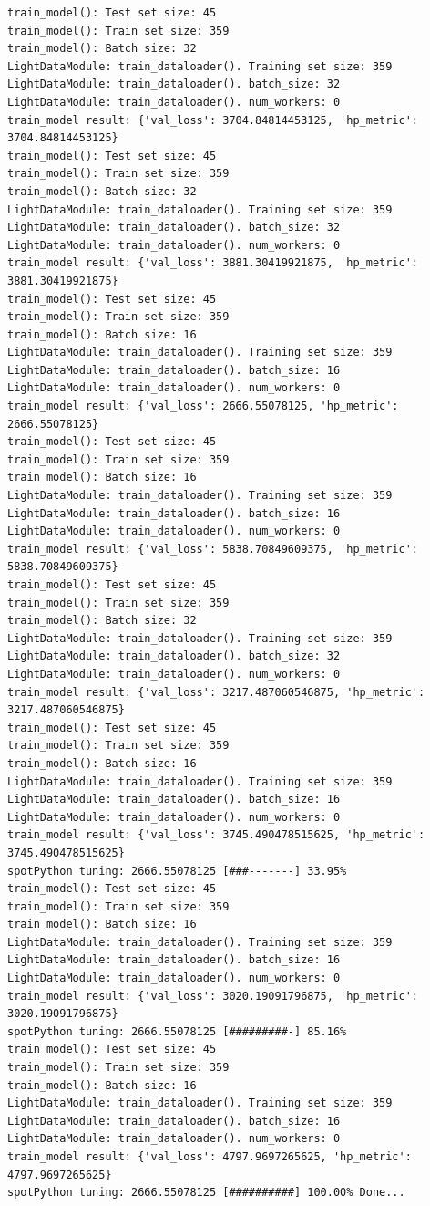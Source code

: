 \documentclass[
  letterpaper,
  DIV=11,
  numbers=noendperiod]{scrreprt}
\begin{document}
\begin{verbatim}
train_model(): Test set size: 45
train_model(): Train set size: 359
train_model(): Batch size: 32
LightDataModule: train_dataloader(). Training set size: 359
LightDataModule: train_dataloader(). batch_size: 32
LightDataModule: train_dataloader(). num_workers: 0
train_model result: {'val_loss': 3704.84814453125, 'hp_metric': 3704.84814453125}
train_model(): Test set size: 45
train_model(): Train set size: 359
train_model(): Batch size: 32
LightDataModule: train_dataloader(). Training set size: 359
LightDataModule: train_dataloader(). batch_size: 32
LightDataModule: train_dataloader(). num_workers: 0
train_model result: {'val_loss': 3881.30419921875, 'hp_metric': 3881.30419921875}
train_model(): Test set size: 45
train_model(): Train set size: 359
train_model(): Batch size: 16
LightDataModule: train_dataloader(). Training set size: 359
LightDataModule: train_dataloader(). batch_size: 16
LightDataModule: train_dataloader(). num_workers: 0
train_model result: {'val_loss': 2666.55078125, 'hp_metric': 2666.55078125}
train_model(): Test set size: 45
train_model(): Train set size: 359
train_model(): Batch size: 16
LightDataModule: train_dataloader(). Training set size: 359
LightDataModule: train_dataloader(). batch_size: 16
LightDataModule: train_dataloader(). num_workers: 0
train_model result: {'val_loss': 5838.70849609375, 'hp_metric': 5838.70849609375}
train_model(): Test set size: 45
train_model(): Train set size: 359
train_model(): Batch size: 32
LightDataModule: train_dataloader(). Training set size: 359
LightDataModule: train_dataloader(). batch_size: 32
LightDataModule: train_dataloader(). num_workers: 0
train_model result: {'val_loss': 3217.487060546875, 'hp_metric': 3217.487060546875}
train_model(): Test set size: 45
train_model(): Train set size: 359
train_model(): Batch size: 16
LightDataModule: train_dataloader(). Training set size: 359
LightDataModule: train_dataloader(). batch_size: 16
LightDataModule: train_dataloader(). num_workers: 0
train_model result: {'val_loss': 3745.490478515625, 'hp_metric': 3745.490478515625}
spotPython tuning: 2666.55078125 [###-------] 33.95% 
train_model(): Test set size: 45
train_model(): Train set size: 359
train_model(): Batch size: 16
LightDataModule: train_dataloader(). Training set size: 359
LightDataModule: train_dataloader(). batch_size: 16
LightDataModule: train_dataloader(). num_workers: 0
train_model result: {'val_loss': 3020.19091796875, 'hp_metric': 3020.19091796875}
spotPython tuning: 2666.55078125 [#########-] 85.16% 
train_model(): Test set size: 45
train_model(): Train set size: 359
train_model(): Batch size: 16
LightDataModule: train_dataloader(). Training set size: 359
LightDataModule: train_dataloader(). batch_size: 16
LightDataModule: train_dataloader(). num_workers: 0
train_model result: {'val_loss': 4797.9697265625, 'hp_metric': 4797.9697265625}
spotPython tuning: 2666.55078125 [##########] 100.00% Done...
\end{verbatim}
\end{document}
